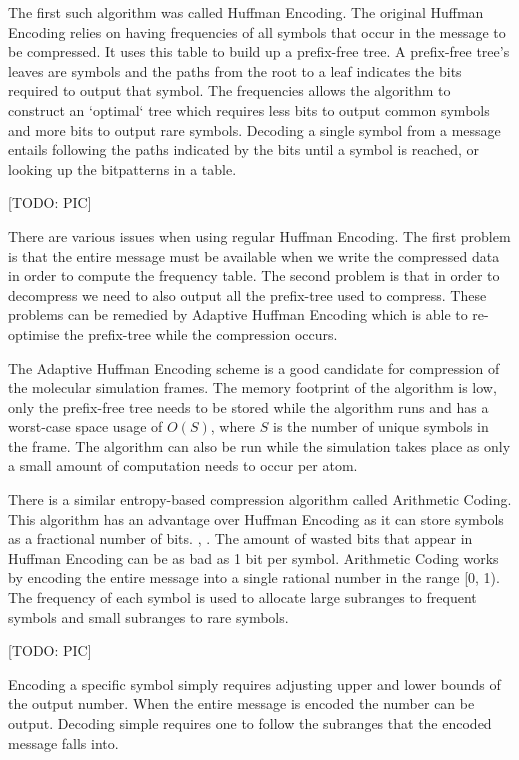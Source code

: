 \documentclass[a4paper,11pt]{report}
\begin{document}
The first such algorithm was called Huffman Encoding\cite{citeulike:1320251}. The original Huffman Encoding relies on having frequencies of all symbols that occur in the message to be compressed. It uses this table to build up a prefix-free tree. A prefix-free tree's leaves are symbols and the paths from the root to a leaf indicates the bits required to output that symbol. The frequencies allows the algorithm to construct an `optimal` tree which requires less bits to output common symbols and more bits to output rare symbols. Decoding a single symbol from a message  entails following the paths indicated by the bits until a symbol is reached, or looking up the bitpatterns in a table.

[TODO: PIC]

There are various issues when using regular Huffman Encoding. The first problem is that the entire message must be available when we write the compressed data in order to compute the frequency table.\cite{RefWorks:1} The second problem is that in order to decompress we need to also output all the prefix-tree used to compress. These problems can be remedied by Adaptive Huffman Encoding\cite{42227} which is able to re-optimise the prefix-tree while the compression occurs.

The Adaptive Huffman Encoding scheme is a good candidate for compression of the molecular simulation frames. The memory footprint of the algorithm is low, only the prefix-free tree needs to be stored while the algorithm runs and has a worst-case space usage of $O(S)$, where $S$ is the number of unique symbols in the frame. The algorithm can also be run while the simulation takes place as only a small amount of computation needs to occur per atom.

There is a similar entropy-based compression algorithm called Arithmetic Coding. This algorithm has an advantage over Huffman Encoding as it can store symbols as a fractional number of bits. \cite{RefWorks:1}, \cite{RefWorks:3}. The amount of wasted bits that appear in Huffman Encoding can be as bad as 1 bit per symbol. Arithmetic Coding works by encoding the entire message into a single rational number in the range [0, 1). The frequency of each symbol is used to allocate large subranges to frequent symbols and small subranges to rare symbols. 

[TODO: PIC]

Encoding a specific symbol simply requires adjusting upper and lower bounds of the output number. When the entire message is encoded the number can be output. Decoding simple requires one to follow the subranges that the encoded message falls into.
\end{document}
